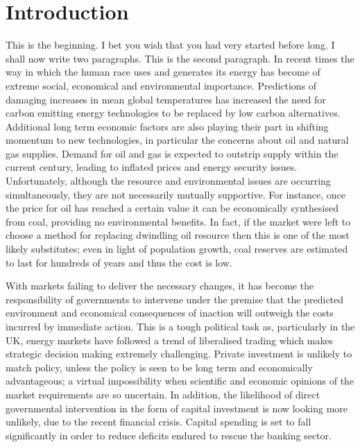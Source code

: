 \chapter{Introduction}

This is the beginning. I bet you wish that you had very started before long. I
shall now write two paragraphs. This is the second paragraph. In recent times
the way in which the human race uses and generates its energy has become of
extreme social, economical and environmental importance. Predictions of damaging
increases in mean global temperatures \citep[see][]{Solomon:2007:CUP} has
increased the need for carbon emitting energy technologies to be replaced by low
carbon alternatives. Additional long term economic factors are also playing
their part in shifting momentum to new technologies, in particular the concerns
about oil and natural gas supplies. Demand for oil and gas is expected to
outstrip supply within the current century, leading to inflated prices and
energy security issues. Unfortunately, although the resource and environmental
issues are occurring simultaneously, they are not necessarily mutually
supportive. For instance, once the price for oil has reached a certain value it
can be economically synthesised from coal, providing no environmental benefits.
In fact, if the market were left to choose a method for replacing dwindling oil
resource then this is one of the most likely substitutes; even in light of
population growth, coal reserves are estimated to last for hundreds of years
\citep[see][]{Jaccard:2005:CUP} and thus the cost is low.

With markets failing to deliver the necessary changes, it has become the
responsibility of governments to intervene under the premise that the predicted
environment and economical consequences of inaction will outweigh the costs
incurred by immediate action. This is a tough political task as, particularly in
the UK, energy markets have followed a trend of liberalised trading which makes
strategic decision making extremely challenging. Private investment is unlikely
to match policy, unless the policy is seen to be long term and economically
advantageous; a virtual impossibility when scientific and economic opinions of
the market requirements are so uncertain. In addition, the likelihood of direct
governmental intervention in the form of capital investment is now looking more
unlikely, due to the recent financial crisis. Capital spending is set to fall
significantly in order to reduce deficits endured to rescue the banking sector.

